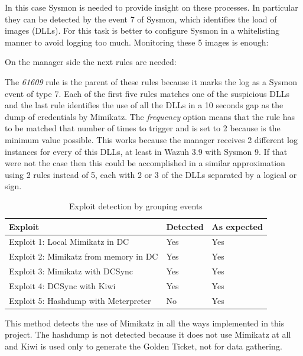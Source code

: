 \linej
In this case Sysmon is needed to provide insight on these processes. In particular they can be detected by the event 7 of Sysmon, which identifies the load of images (DLLs)\cite{sysmon}\cite{sysmon_event_7_mimikatz}.
\linej
\linej
For this task is better to configure Sysmon in a whitelisting manner to avoid logging too much. Monitoring these 5 images is enough:
\linej

\linej
On the manager side the next rules are needed:
\linej

\linej
The \textit{61609} rule is the parent of these rules because it marks the log as a Sysmon event of type 7. Each of the first five rules matches one of the suspicious DLLs and the last rule identifies the use of all the DLLs in a 10 seconds gap as the dump of credentials by Mimikatz.
\linej
The \textit{frequency} option means that the rule has to be matched that number of times to trigger and is set to 2 because is the minimum value possible. This works because the manager receives 2 different log instances for every of this DLLs, at least in Wazuh 3.9 with Sysmon 9. If that were not the case then this could be accomplished in a similar approximation using 2 rules instead of 5, each with 2 or 3 of the DLLs separated by a logical or sign.

\begin{table}[H]
	\centering
	\begin{tabular}{|l|l|l|}
		\hline
		\rowcolor{gray!30}
		Exploit & Detected & As expected \\ \hline
		Exploit 1: Local Mimikatz in DC& \cellcolor{green!60}Yes& \cellcolor{green!60}Yes\\ \hline
		Exploit 2: Mimikatz from memory in DC& \cellcolor{green!60}Yes& \cellcolor{green!60}Yes\\ \hline
		Exploit 3: Mimikatz with DCSync& \cellcolor{green!60}Yes& \cellcolor{green!60}Yes\\ \hline
		Exploit 4: DCSync with Kiwi& \cellcolor{green!60}Yes& \cellcolor{green!60}Yes\\ \hline
		Exploit 5: Hashdump with Meterpreter& \cellcolor{red!60}No& \cellcolor{green!60}Yes\\ \hline
	\end{tabular}
	\caption{Exploit detection by grouping events}
\end{table}
This method detects the use of Mimikatz in all the ways implemented in this project. The hashdump is not detected because it does not use Mimikatz at all and Kiwi is used only to generate the Golden Ticket, not for data gathering.

